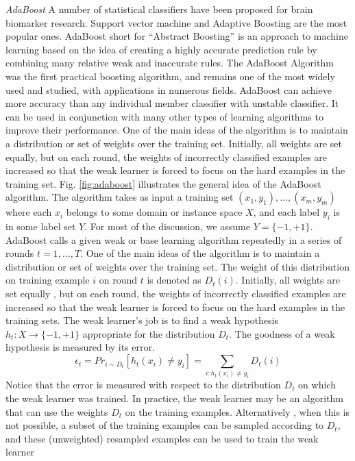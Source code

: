 \documentclass[authoryear,preprint,revi	ew,12pt]{elsarticle}
\begin{document}
\textit{AdaBoost}
A number of statistical classifiers have been proposed for brain biomarker research. Support vector machine and Adaptive Boosting are the most popular ones. AdaBoost short for ``Abstract Boosting'' is an approach to machine learning based on the idea of creating a highly accurate prediction rule by combining many relative weak and inaccurate rules. The AdaBoost Algorithm \citep{freund1996experiments} was the first practical boosting algorithm, and remains one of the most widely used and studied, with applications in numerous fields. AdaBoost can achieve more accuracy than any individual member classifier with unstable classifier. It can be used in conjunction with many other types of learning algorithms to improve their performance. One of the main ideas of the algorithm is to maintain a distribution or set of weights over the training set.  Initially, all weights are set equally, but on each round, the weights of incorrectly classified examples are increased so that the weak learner is forced to focus on the hard examples in the training set. Fig. \ref{fig:adaboost} illustrates the general idea of the AdaBoost algorithm. The algorithm takes as input a training set $ (x_1,y_1), \dots , (x_m,y_m) $ where each $ x_i $ belongs to some domain or instance space $ X $, and each label $ y_i $ is in some label set $ Y $. For most of the discussion, we assume $ Y = \{-1, +1\} $. AdaBoost calls a given weak or base learning  algorithm repeatedly in a series of rounds $ t = 1,\dots,T $. One of the main ideas of the algorithm is to maintain a distribution or set of weights over the training set. The weight of this distribution on training example $ i $ on round $ t $ is denoted as $ D_t(i) $. Initially, all weights are set equally , but on each round, the weights of incorrectly classified examples are increased so that the weak learner is forced to focus on the hard examples in the training sets.
The weak learner's job is to find a weak hypothesis $ h_t : X \to \{-1 ,+1\}$ appropriate for the distribution $ D_t $. The goodness of a weak hypothesis is measured by its error.
$$ \epsilon_t = Pr_{i \sim D_t}[h_t(x_i) \neq y_i] = \underset{i:h_t(x_i) \neq y_i}{\sum} D_t(i)  $$
Notice that the error is measured with respect to the distribution $ D_t $ on which the weak learner was trained. In practice, the weak learner may be an algorithm that can use the weights $ D_t $ on the training examples. Alternatively , when this is not possible, a subset of the training examples can be sampled according to $ D_t $, and these (unweighted) resampled examples can be used to train the weak learner~\cite{schapire2013explaining}
\end{document}
